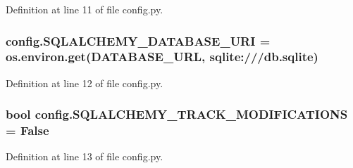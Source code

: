 Definition at line 11 of file config.\+py.

\subsubsection[{\texorpdfstring{S\+Q\+L\+A\+L\+C\+H\+E\+M\+Y\+\_\+\+D\+A\+T\+A\+B\+A\+S\+E\+\_\+\+U\+RI}{SQLALCHEMY_DATABASE_URI}}]{\setlength{\rightskip}{0pt plus 5cm}config.\+S\+Q\+L\+A\+L\+C\+H\+E\+M\+Y\+\_\+\+D\+A\+T\+A\+B\+A\+S\+E\+\_\+\+U\+RI = os.\+environ.\+get(\textquotesingle{}D\+A\+T\+A\+B\+A\+S\+E\+\_\+\+U\+RL\textquotesingle{}, \textquotesingle{}sqlite\+:///db.\+sqlite\textquotesingle{})}\hypertarget{namespaceconfig_abfb380a150ba49f3296981414777eed8}{}\label{namespaceconfig_abfb380a150ba49f3296981414777eed8}


Definition at line 12 of file config.\+py.

\subsubsection[{\texorpdfstring{S\+Q\+L\+A\+L\+C\+H\+E\+M\+Y\+\_\+\+T\+R\+A\+C\+K\+\_\+\+M\+O\+D\+I\+F\+I\+C\+A\+T\+I\+O\+NS}{SQLALCHEMY_TRACK_MODIFICATIONS}}]{\setlength{\rightskip}{0pt plus 5cm}bool config.\+S\+Q\+L\+A\+L\+C\+H\+E\+M\+Y\+\_\+\+T\+R\+A\+C\+K\+\_\+\+M\+O\+D\+I\+F\+I\+C\+A\+T\+I\+O\+NS = False}\hypertarget{namespaceconfig_af3c11aea509436fc561e22b8a479f7b3}{}\label{namespaceconfig_af3c11aea509436fc561e22b8a479f7b3}


Definition at line 13 of file config.\+py.

